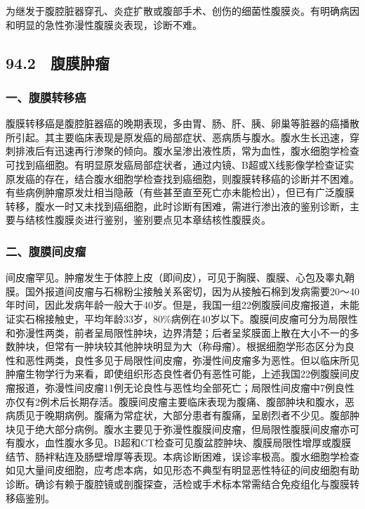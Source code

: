 为继发于腹腔脏器穿孔、炎症扩散或腹部手术、创伤的细菌性腹膜炎。有明确病因和明显的急性弥漫性腹膜炎表现，诊断不难。

\protect\hypertarget{text00223.html}{}{}

\subsection{94.2　腹膜肿瘤}

\subsubsection{一、腹膜转移癌}

腹膜转移癌是腹腔脏器癌的晚期表现，多由胃、肠、肝、胰、卵巢等脏器的癌播散所引起。其主要临床表现是原发癌的局部症状、恶病质与腹水。腹水生长迅速，穿刺排液后有迅速再行渗聚的倾向。腹水呈渗出液性质，常为血性，腹水细胞学检查可找到癌细胞。有明显原发癌局部症状者，通过内镜、B超或X线影像学检查证实原发癌的存在，结合腹水细胞学检查找到癌细胞，则腹膜转移癌的诊断并不困难。有些病例肿瘤原发灶相当隐蔽（有些甚至直至死亡亦未能检出），但已有广泛腹膜转移，腹水一时又未找到癌细胞，此时诊断有困难，需进行渗出液的鉴别诊断，主要与结核性腹膜炎进行鉴别，鉴别要点见本章结核性腹膜炎。

\subsubsection{二、腹膜间皮瘤}

间皮瘤罕见。肿瘤发生于体腔上皮（即间皮），可见于胸膜、腹膜、心包及睾丸鞘膜。国外报道间皮瘤与石棉粉尘接触关系密切，因为从接触石棉到发病需要20～40年时间，因此发病年龄一般大于40岁。但是，我国一组22例腹膜间皮瘤报道，未能证实石棉接触史，平均年龄33岁，80\%病例在40岁以下。腹膜间皮瘤可分为局限性和弥漫性两类，前者呈局限性肿块，边界清楚；后者呈浆膜面上散在大小不一的多数肿块，但常有一肿块较其他肿块明显为大（称母瘤）。根据细胞学形态区分为良性和恶性两类，良性多见于局限性间皮瘤，弥漫性间皮瘤多为恶性。但以临床所见肿瘤生物学行为来看，即使组织形态良性者仍有恶性可能，上述我国22例腹膜间皮瘤报道，弥漫性间皮瘤11例无论良性与恶性均全部死亡；局限性间皮瘤中7例良性亦仅有2例术后长期存活。腹膜间皮瘤主要临床表现为腹痛、腹部肿块和腹水，恶病质见于晚期病例。腹痛为常症状，大部分患者有腹痛，呈剧烈者不少见。腹部肿块见于绝大部分病例。腹水主要见于弥漫性腹膜间皮瘤，但局限性腹膜间皮瘤亦可有腹水，血性腹水多见。B超和CT检查可见腹盆腔肿块、腹膜局限性增厚或腹膜结节、肠袢粘连及肠壁增厚等表现。本病诊断困难，误诊率极高。腹水细胞学检查如见大量间皮细胞，应考虑本病，如见形态不典型有明显恶性特征的间皮细胞有助诊断。确诊有赖于腹腔镜或剖腹探查，活检或手术标本常需结合免疫组化与腹膜转移癌鉴别。

